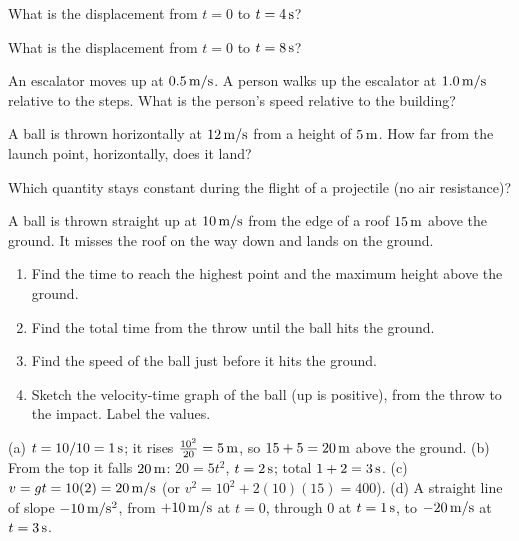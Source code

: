 \begin{exo}{}
What is the displacement from $t=0$ to $t=4\,\mathrm{s}$?
\end{exo}
\begin{exo}{}
What is the displacement from $t=0$ to $t=8\,\mathrm{s}$?
\choices{$24\m$}{$32\m$}{$16\m$}{$20\m$}
\end{exo}
\begin{exo}{}
An escalator moves up at $0.5\ms$. A person walks up the escalator at $1.0\ms$ relative to the steps. What is the person's speed relative to the building?
\choices{$1.5\ms$}{$0.5\ms$}{$1.0\ms$}{$2.0\ms$}
\end{exo}
\begin{exo}{}
A ball is thrown horizontally at $12\,\mathrm{m/s}$ from a height of $5\,\mathrm{m}$. How far from the launch point, horizontally, does it land?
\choices{$6\m$}{$24\m$}{$60\m$}{$12\m$}
\end{exo}
\begin{exo}{}
Which quantity stays constant during the flight of a projectile (no air resistance)?
\end{exo}
\begin{exo}{}
A ball is thrown straight up at $10\,\mathrm{m/s}$ from the edge of a roof $15\,\mathrm{m}$ above the ground. It misses the roof on the way down and lands on the ground.
\begin{enumerate}[label=(\alph*)]
\item Find the time to reach the highest point and the maximum height above the ground.
\item Find the total time from the throw until the ball hits the ground.
\item Find the speed of the ball just before it hits the ground.
\item Sketch the velocity-time graph of the ball (up is positive), from the throw to the impact. Label the values.
\end{enumerate}
\work{5cm}
\begin{solution}
(a) $t=10/10=1\,\mathrm{s}$; it rises $\frac{10^2}{20}=5\,\mathrm{m}$, so $15+5=20\,\mathrm{m}$ above the ground. \;(b) From the top it falls $20\m$: $20=5t^2$, $t=2\,\mathrm{s}$; total $1+2=3\,\mathrm{s}$. \;(c) $v=gt=10(2)=20\,\mathrm{m/s}$ (or $v^2=10^2+2(10)(15)=400$). \;(d) A straight line of slope $-10\,\mathrm{m/s^2}$, from $+10\,\mathrm{m/s}$ at $t=0$, through $0$ at $t=1\,\mathrm{s}$, to $-20\,\mathrm{m/s}$ at $t=3\,\mathrm{s}$.
\end{solution}
\end{exo}
